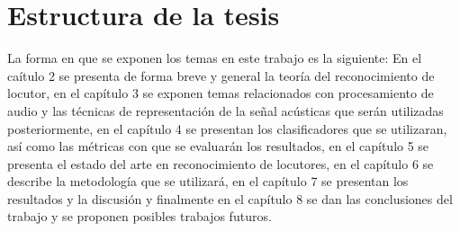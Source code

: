 \section{Estructura de la tesis} \label{sect:estructura}

La forma en que se exponen los temas en este trabajo es la siguiente: En el ca\'itulo 2 se presenta de forma breve y general la teor\'ia del reconocimiento de locutor, en el cap\'itulo 3 se exponen temas relacionados con procesamiento de audio y las t\'ecnicas de representaci\'on de la señal ac\'usticas que ser\'an utilizadas posteriormente, en el cap\'itulo 4 se presentan los clasificadores que se utilizaran, as\'i como las m\'etricas con que se evaluar\'an los resultados, en el cap\'itulo 5 se presenta el estado del arte en reconocimiento de locutores, en el cap\'itulo 6 se describe la metodolog\'ia que se utilizar\'a, en el cap\'itulo 7 se presentan los resultados y la discusi\'on y finalmente en el cap\'itulo 8 se dan las conclusiones del trabajo y se proponen posibles trabajos futuros.\\

